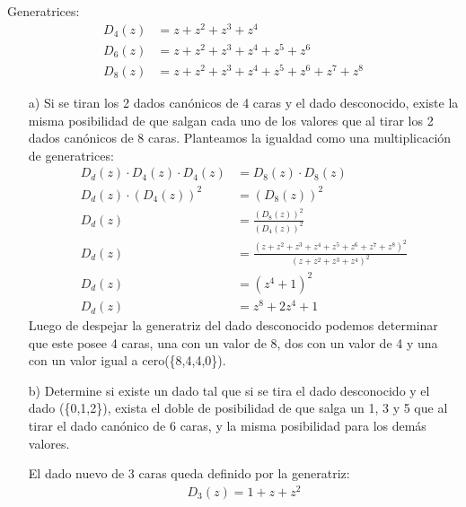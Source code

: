 \documentclass[spanish, fleqn]{article}
\begin{document}
    Generatrices:
    \begin{align*}
    D_{4}(z)&=z+z^2+z^3+z^4\\
    D_{6}(z)&=z+z^2+z^3+z^4+z^5+z^6 \\
    D_{8}(z)&=z+z^2+z^3+z^4+z^5+z^6+z^7+z^8
    \end{align*}
    
    \begin{itemize}
    \item[a)] Si se tiran los 2 dados canónicos de 4 caras y el dado desconocido, existe la misma posibilidad de que salgan cada uno de los valores que al tirar los 2 dados canónicos de 8 caras.
    Planteamos la igualdad como una multiplicación de generatrices:
    \begin{align*}
    D_d(z) \cdot D_4(z) \cdot D_4(z) &= D_8(z) \cdot D_8(z)\\
    D_d(z) \cdot (D_4(z))^2 &=(D_8(z))^2\\
    D_d(z)&=\frac{(D_8(z))^2}{(D_4(z))^2}\\
    D_d(z)&=\frac{(z+z^2+z^3+z^4+z^5+z^6+z^7+z^8)^2}{(z+z^2+z^3+z^4)^2}\\
    D_d(z)&=(z^4+1)^2\\
    D_d(z)&=z^8+2z^4+1
    \end{align*}
    Luego de despejar la generatriz del dado desconocido podemos determinar que este posee 4 caras, una con un valor de 8, dos con un valor de 4 y una con un valor igual a cero(\{8,4,4,0\}).
    
    \item[b)] Determine si existe un dado tal que si se tira el dado desconocido y el dado (\{0,1,2\}), exista el doble de posibilidad de que salga un 1, 3 y 5 que al tirar el dado canónico de 6 caras, y la misma posibilidad para los demás valores.
    
    El dado nuevo de 3 caras queda definido por la generatriz:
    \begin{align*}
    D_3(z)=1+z+z^2
    \end{align*}
    

\end{itemize}
\end{document}
